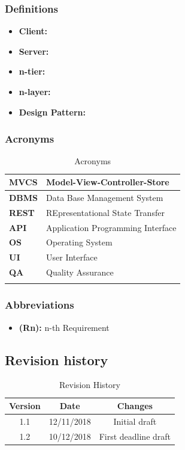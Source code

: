 \documentclass[titlepage]{article}
\begin{document}
	\subsubsection{Definitions}
	
	\begin{itemize}
				\item {\bf Client: } 
				\item {\bf Server: } 
				\item {\bf n-tier: } 
				\item {\bf n-layer: } 
				\item {\bf Design Pattern: } 
	\end{itemize}
	
	
	\subsubsection{Acronyms}
	
	\begin{longtable}{| p{2 cm} | p{7 cm} |} \hline
		{\bf MVCS} & Model-View-Controller-Store \\\hline
		{\bf DBMS} & Data Base Management System \\ \hline
		{\bf REST} & REpresentational State Transfer \\ \hline
		{\bf API} & Application Programming Interface \\ \hline
		{\bf OS} & Operating System\\ \hline
		{\bf UI} & User Interface \\ \hline
		{\bf QA} & Quality Assurance \\ \hline				
		\caption{Acronyms}	
						
	\end{longtable}

	\subsubsection{Abbreviations}
	
	\begin{itemize}
		\item {\bf (Rn):} n-th Requirement
	\end{itemize}
			
			
\subsection{Revision history}

\begin{table}[ht]
	\centering
	\begin{tabular}{ccc} 
		Version & Date & Changes  \\ 
		\hline
		1.1 & 12/11/2018 & Initial draft \\
		1.2 & 10/12/2018 & First deadline draft \\
	\end{tabular}
	\caption{Revision History}
	\label{default}
\end{table}
	
\end{document}
